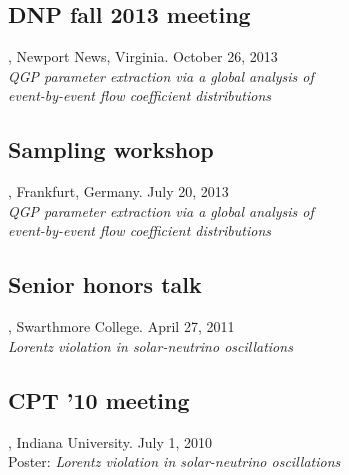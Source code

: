 \documentclass[letterpaper,10pt]{article}
\begin{document}
\subsection{DNP fall 2013 meeting}, Newport News, Virginia. \hfill October 26, 2013 \\
\emph{QGP parameter extraction via a global analysis of \\ event-by-event flow coefficient distributions}

\subsection{Sampling workshop}, Frankfurt, Germany. \hfill July 20, 2013 \\
\emph{QGP parameter extraction via a global analysis of \\ event-by-event flow coefficient distributions}

\subsection{Senior honors talk}, Swarthmore College. \hfill April 27, 2011 \\
\emph{Lorentz violation in solar-neutrino oscillations}

\subsection{CPT '10 meeting}, Indiana University. \hfill July 1, 2010 \\
Poster: \emph{Lorentz violation in solar-neutrino oscillations}



\pagebreak
\end{document}

